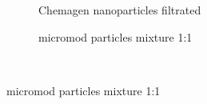 \begin{figure}[H]
          \begin{subfigure}{0.49\textwidth}
                  \caption{Chemagen nanoparticles filtrated }\label{fig:hist_chemagen}
          \end{subfigure}\hfill	
	  \begin{subfigure}{0.49\textwidth}
                  \caption{micromod particles mixture 1:1}\label{fig:hist_micro_mix}
          \end{subfigure}\hfill	\\

\end{figure}
